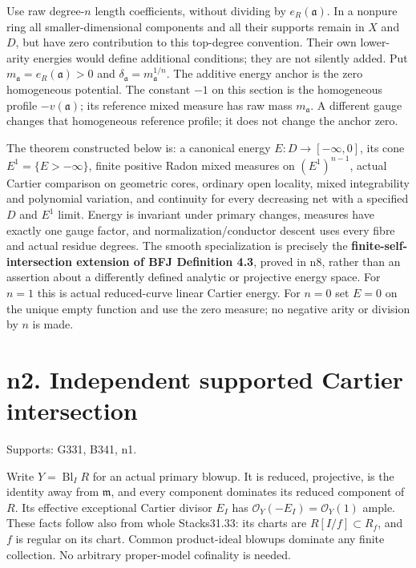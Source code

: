 \documentclass[
  11pt,
]{article}
\begin{document}
Use raw degree-\(n\) length coefficients, without dividing by
\(e_R(\mathfrak a)\). In a nonpure ring all smaller-dimensional
components and all their supports remain in \(X\) and \(D\), but have
zero contribution to this top-degree convention. Their own lower-arity
energies would define additional conditions; they are not silently
added. Put \(m_{\mathfrak a}=e_R(\mathfrak a)>0\) and
\(\delta_{\mathfrak a}=m_{\mathfrak a}^{1/n}\). The additive energy
anchor is the zero homogeneous potential. The constant \(-1\) on this
section is the homogeneous profile \(-v(\mathfrak a)\); its reference
mixed measure has raw mass \(m_{\mathfrak a}\). A different gauge
changes that homogeneous reference profile; it does not change the
anchor zero.

The theorem constructed below is: a canonical energy
\(E:D\to[-\infty,0]\), its cone \(E^1=\{E> -\infty\}\), finite positive
Radon mixed measures on \((E^1)^{n-1}\), actual Cartier comparison on
geometric cores, ordinary open locality, mixed integrability and
polynomial variation, and continuity for every decreasing net with a
specified \(D\) and \(E^1\) limit. Energy is invariant under primary
changes, measures have exactly one gauge factor, and
normalization/conductor descent uses every fibre and actual residue
degrees. The smooth specialization is precisely the
\textbf{finite-self-intersection extension of BFJ Definition 4.3},
proved in n8, rather than an assertion about a differently defined
analytic or projective energy space. For \(n=1\) this is actual
reduced-curve linear Cartier energy. For \(n=0\) set \(E=0\) on the
unique empty function and use the zero measure; no negative arity or
division by \(n\) is made.

\section{n2. Independent supported Cartier
intersection}\label{n2.-independent-supported-cartier-intersection}

Supports: G331, B341, n1.

Write \(Y=\operatorname{Bl}_I R\) for an actual primary blowup. It is
reduced, projective, is the identity away from \(\mathfrak m\), and
every component dominates its reduced component of \(R\). Its effective
exceptional Cartier divisor \(E_I\) has
\(\mathcal O_Y(-E_I)=\mathcal O_Y(1)\) ample. These facts follow also
from whole Stacks31.33: its charts are \(R[I/f]\subset R_f\), and \(f\)
is regular on its chart. Common product-ideal blowups dominate any
finite collection. No arbitrary proper-model cofinality is needed.
\end{document}
